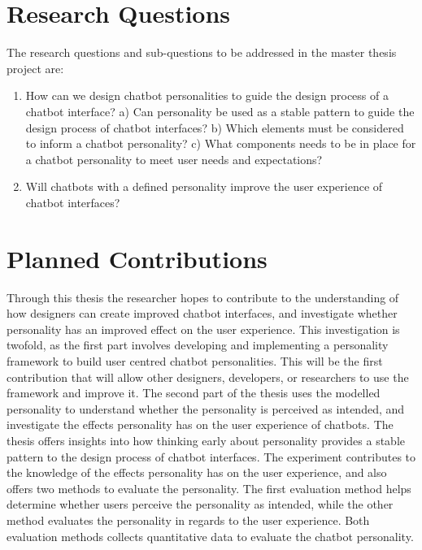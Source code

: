 \vspace{5mm} %

\section{Research Questions}

The research questions and sub-questions to be addressed in the master thesis project are:

\begin{enumerate}
    \item How can we design chatbot personalities to guide the design process of a chatbot interface? 
        \subitem a) Can personality be used as a stable pattern to guide the design \subitem    process of chatbot interfaces?
        \subitem b) Which elements must be considered to inform a chatbot personality?
        \subitem c) What components needs to be in place for a chatbot personality to \subitem  meet user needs and expectations?
    \item Will chatbots with a defined personality improve the user experience of chatbot interfaces?
\end{enumerate}

\vspace{5mm} %

\section{Planned Contributions}
Through this thesis the researcher hopes to contribute to the understanding of how designers can create improved chatbot interfaces, and investigate whether personality has an improved effect on the user experience. This investigation is twofold, as the first part involves developing and implementing a personality framework to build user centred chatbot personalities. This will be the first contribution that will allow other designers, developers, or researchers to use the framework and improve it. The second part of the thesis uses the modelled personality to understand whether the personality is perceived as intended, and investigate the effects personality has on the user experience of chatbots. The thesis offers insights into how thinking early about personality provides a stable pattern to the design process of chatbot interfaces. The experiment contributes to the knowledge of the effects personality has on the user experience, and also offers two methods to evaluate the personality. The first evaluation method helps determine whether users perceive the personality as intended, while the other method evaluates the personality in regards to the user experience. Both evaluation methods collects quantitative data to evaluate the chatbot personality.

